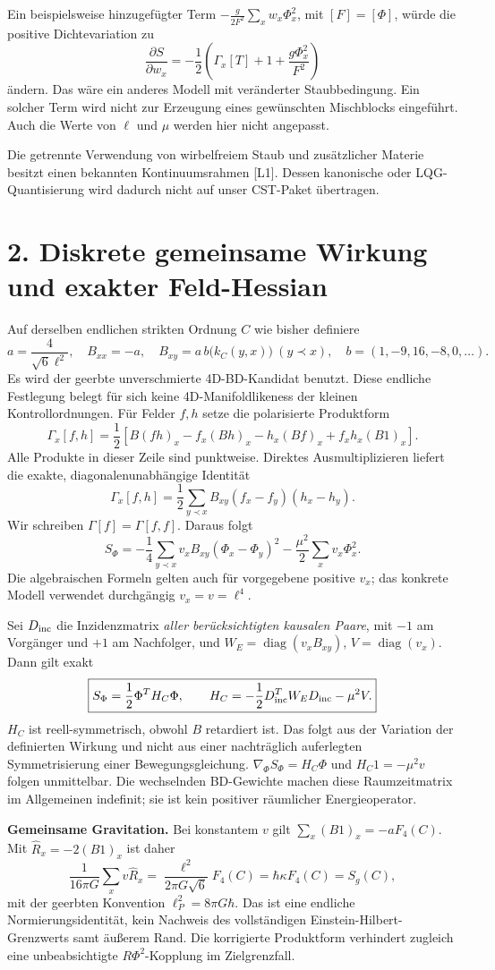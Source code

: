 \documentclass[10pt,a4paper]{article}
\newcommand{\sect}[1]{\section*{\color{navy}#1}}
\begin{document}
Ein beispielsweise hinzugefügter Term
$-\frac g{2F^2}\sum_xw_x\Phi_x^2$, mit $[F]=[\Phi]$, würde die positive
Dichtevariation zu
\[
\frac{\partial S}{\partial w_x}
=-\frac12\left(\Gamma_x[T]+1+\frac{g\Phi_x^2}{F^2}\right)
\]
ändern. Das wäre ein anderes Modell mit veränderter Staubbedingung.
Ein solcher Term wird nicht zur Erzeugung eines gewünschten Mischblocks
eingeführt. Auch die Werte von $\ell$ und $\mu$ werden hier nicht angepasst.

Die getrennte Verwendung von wirbelfreiem Staub und zusätzlicher Materie
besitzt einen bekannten Kontinuumsrahmen [L1]. Dessen kanonische oder
LQG-Quantisierung wird dadurch nicht auf unser CST-Paket übertragen.

\newpage
\sect{2. Diskrete gemeinsame Wirkung und exakter Feld-Hessian}
Auf derselben endlichen strikten Ordnung $C$ wie bisher definiere
\[
a=\frac4{\sqrt6\ell^2},\quad B_{xx}=-a,\quad
B_{xy}=a\,b\bigl(k_C(y,x)\bigr)\ (y\prec x),
\quad b=(1,-9,16,-8,0,\ldots).
\]
Es wird der geerbte unverschmierte 4D-BD-Kandidat benutzt. Diese
endliche Festlegung belegt für sich keine 4D-Manifoldlikeness der kleinen
Kontrollordnungen. Für Felder $f,h$ setze die polarisierte Produktform
\[
\Gamma_x[f,h]=\frac12\left[B(fh)_x-f_x(Bh)_x-h_x(Bf)_x
+f_xh_x(B1)_x\right].
\]
Alle Produkte in dieser Zeile sind punktweise. Direktes Ausmultiplizieren
liefert die exakte, diagonalenunabhängige Identität
\[
\boxed{\Gamma_x[f,h]=\frac12\sum_{y\prec x}
B_{xy}(f_x-f_y)(h_x-h_y).}
\]
Wir schreiben $\Gamma[f]=\Gamma[f,f]$. Daraus folgt
\[
S_\Phi=-\frac14\sum_{y\prec x}v_xB_{xy}(\Phi_x-\Phi_y)^2
-\frac{\mu^2}{2}\sum_xv_x\Phi_x^2.
\]
Die algebraischen Formeln gelten auch für vorgegebene positive $v_x$;
das konkrete Modell verwendet durchgängig $v_x=v=\ell^4$.

Sei $D_{\rm inc}$ die Inzidenzmatrix \emph{aller berücksichtigten kausalen
Paare}, mit $-1$ am Vorgänger und $+1$ am Nachfolger, und
$W_E=\operatorname{diag}(v_xB_{xy})$, $V=\operatorname{diag}(v_x)$.
Dann gilt exakt
\[
\boxed{S_\Phi=\frac12\Phi^TH_C\Phi,
\qquad H_C=-\frac12D_{\rm inc}^TW_ED_{\rm inc}-\mu^2V.}
\]
$H_C$ ist reell-symmetrisch, obwohl $B$ retardiert ist. Das folgt aus
der Variation der definierten Wirkung und nicht aus einer nachträglich
auferlegten Symmetrisierung einer Bewegungsgleichung.
$\nabla_\Phi S_\Phi=H_C\Phi$ und $H_C1=-\mu^2v$ folgen unmittelbar.
Die wechselnden BD-Gewichte machen diese Raumzeitmatrix im Allgemeinen
indefinit; sie ist kein positiver räumlicher Energieoperator.

\textbf{Gemeinsame Gravitation.} Bei konstantem $v$ gilt
$\sum_x(B1)_x=-aF_4(C)$. Mit $\widehat R_x=-2(B1)_x$ ist daher
\[
\frac1{16\pi G}\sum_xv\widehat R_x
=\frac{\ell^2}{2\pi G\sqrt6}F_4(C)=\hbar\kappa F_4(C)=S_g(C),
\]
mit der geerbten Konvention $\ell_P^2=8\pi G\hbar$.
Das ist eine endliche Normierungsidentität, kein Nachweis des vollständigen
Einstein-Hilbert-Grenzwerts samt äußerem Rand. Die korrigierte Produktform
verhindert zugleich eine unbeabsichtigte $R\Phi^2$-Kopplung im Zielgrenzfall.
\end{document}
